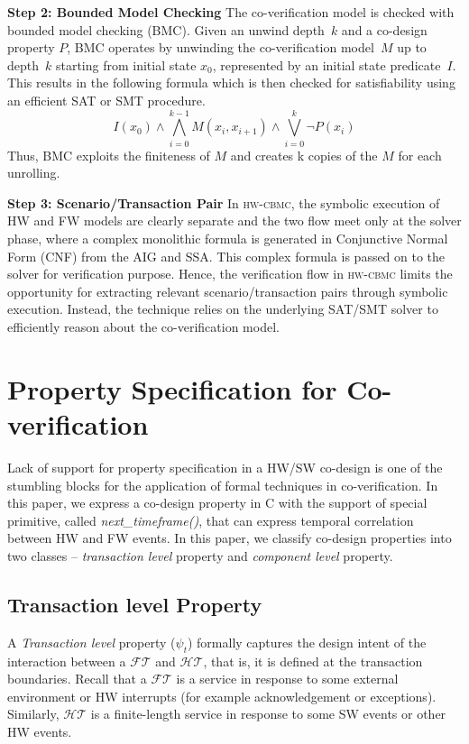 \documentclass[sigconf]{acmart}
\newcommand{\tool}[1]{\textsc{#1}\xspace}
\newcommand{\hwcbmcv}{\tool{hw-cbmc}}
\newcommand{\Omit}[1]{}
\begin{document}
\textbf{Step 2: Bounded Model Checking}
%
The co-verification model is checked with bounded model checking (BMC).
Given an unwind depth~$k$ and a co-design property $P$, BMC operates
by unwinding the co-verification model~$M$ up to depth~$k$ starting from
initial state $x_0$, represented by an initial state predicate~$I$.
This results in the following formula which is then checked for
satisfiability using an efficient SAT or SMT procedure.
%
\[ I(x_0) \wedge \bigwedge_{i=0}^{k-1} M(x_i, x_{i+1}) \wedge \bigvee_{i=0}^{k} 
\neg P(x_i) \]
%
Thus, BMC exploits the finiteness of $M$ and creates k copies of the
$M$ for each unrolling. 



\textbf{Step 3: Scenario/Transaction Pair} In \hwcbmcv, the symbolic execution 
of HW and FW models are clearly separate and the two flow meet only at the
solver phase, where a complex monolithic formula is generated in 
Conjunctive Normal Form (CNF) from the AIG and SSA.  This complex formula 
is passed on to the solver for verification purpose.  
Hence, the verification flow in \hwcbmcv limits the opportunity for extracting 
relevant scenario/transaction pairs through symbolic execution.  Instead, the 
technique relies on the underlying SAT/SMT solver to efficiently reason about 
the co-verification model. 
%
\Omit{
The hardware and firmware run independently of each other. 
The communication between them takes place through these function calls. 
}
\section{Property Specification for Co-verification}\label{property}
Lack of support for property specification in a HW/SW co-design is one of the
stumbling blocks for the application of formal techniques in co-verification.  
In this paper, we express a co-design property in C 
with the support of special primitive, called {\em next\_timeframe()}, 
that can express temporal correlation between HW and FW events. 
In this paper, we classify co-design properties into two 
classes -- {\em transaction level} property and {\em component level} property.
\subsection{Transaction level Property}
A {\em Transaction level} property ($\psi_{t}$) formally captures the 
design intent of the interaction between a $\mathcal{FT}$ and $\mathcal{HT}$, 
that is, it is defined at the transaction boundaries.  
Recall that a $\mathcal{FT}$ is a service in response to some external environment 
or HW interrupts (for example acknowledgement or exceptions). Similarly, 
$\mathcal{HT}$ is a finite-length service in response to some SW events or 
other HW events. 
\end{document}
